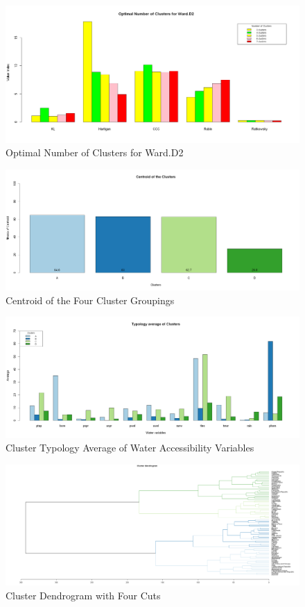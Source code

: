 \documentclass[10pt,twoside]{article}
\numberwithin{equation}{section}
\newcommand{\?}{\stackrel{?}{=}}
\begin{document}
\begin{figure}[h!]
  \centering
  \includegraphics[width=.7\textwidth]{optimal-cuts}
  \caption{Optimal Number of Clusters for Ward.D2}
  \label{fig:optimal}
\end{figure}

\begin{figure}[h!]
  \centering
  \includegraphics[width=.7\textwidth]{centroid}
  \caption{Centroid of the Four Cluster Groupings}
  \label{fig:centroid}
\end{figure}
\begin{figure}[h!]
  \centering
  \includegraphics[width=.7\textwidth]{typology}
  \caption{Cluster Typology Average of Water Accessibility Variables }
  \label{fig:typology}
\end{figure}
\begin{figure}[h!]
  \centering
  \includegraphics[width=.7\textwidth]{dendrogram}
  \caption{Cluster Dendrogram with Four Cuts}
  \label{fig:dendrogram}
\end{figure}
\end{document}
